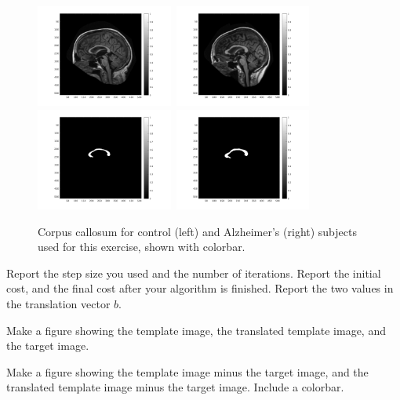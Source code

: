 \documentclass[17pt,landscape]{extarticle}
\begin{document}
\begin{figure}
\centering
\includegraphics[width=0.4\textwidth]{MRI_Con.png}~\includegraphics[width=0.4\textwidth]{MRI_Alz.png}
\includegraphics[width=0.4\textwidth]{CC_Con.png}~\includegraphics[width=0.4\textwidth]{CC_Alz.png}
\caption{\label{fig:CC} Corpus callosum for control (left) and Alzheimer's (right)  subjects used for this exercise, shown with colorbar.}
\end{figure}

Report the step size you used and the number of iterations.  Report the initial cost, and the final cost after your algorithm is finished.  Report the two values in the translation vector $b$.

Make a figure showing the template image, the translated template image, and the target image.

Make a figure showing the template image minus the target image, and the translated template image minus the target image. Include a colorbar.
\end{document}
